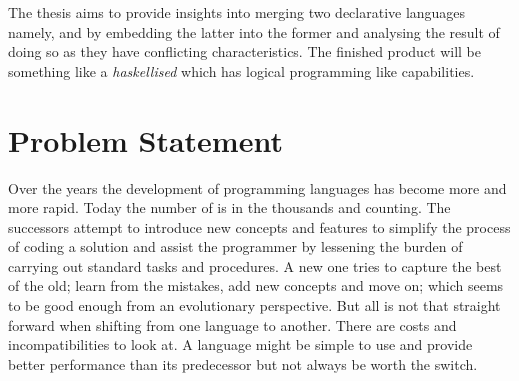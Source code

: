 \documentclass[thesis-solanki.tex]{subfiles}
\begin{document}
The thesis aims to provide insights into merging two declarative languages namely,  and  by embedding 
the latter into the former and analysing the result of doing so as they have conflicting characteristics. The finished product will be 
something like a \textit{haskellised}  which has logical programming like capabilities.       


\section{Problem Statement}

Over the years the development of programming languages has become more and more rapid. Today the number of is in the thousands and counting. The 
successors attempt to introduce new concepts and features to simplify the process of coding a solution and assist the programmer by lessening the 
burden of carrying out standard tasks and procedures. A new one tries to capture the best of the old; learn from the mistakes, add new concepts and 
move on; which seems to be good enough from an evolutionary perspective. But all is not that straight forward when shifting from one language 
to another. There are costs and incompatibilities to look at. A language might be simple to use and provide better performance than its 
predecessor but not always be worth the switch.

\begin{comment}
\par \progLang{Prolog} has a similar story. It was born in an era where procedural programming had made everyone notice their presence. Talking about 
competition, it was against something radical; the \progLang{C} programming language. The languages \progLang{C} has influenced is off the chart and 
so is the performance. It had paved the way for structured procedural programming and had given birth to the Unix operating system. Though the 
original version of \progLang{Prolog} has given rise to a large number of different flavours but a few drawbacks remain through the bloodline and as a 
result it did become the first choice. Some basic requirements such as modules are not provided by all compilers. To make it do real world stuff, a set of 
practical features are pushed in now and then which results in the loss of the purely declarative charm. The problem is that \progLang{Prolog} is fading 
away, \cite{website:prolog-steam,website:prolog-death,website:prolog-killer}, not many people use it and most of the times when it is used, the variant 
is usually \textit{practical} \progLang{Prolog} and the area being academia. It is not used for building large programs \cite{wikiprolog,somogyi1995
logic,website:prolog1000db}. But there are a lot of good things about \progLang{Prolog} that should not die away. Moreover, \progLang{Prolog} is ideal 
for search problems. 
\end{comment}
\end{document}
